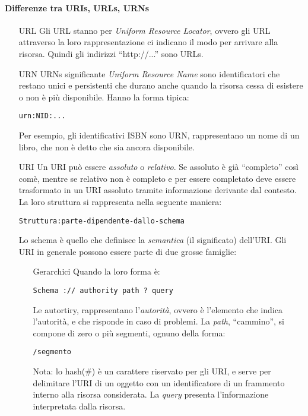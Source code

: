 \paragraph*{Differenze tra URIs, URLs, URNs}
\begin{itemize}
  \item[URL] Gli URL stanno per \textit{Uniform Resource Locator}, ovvero gli URL attraverso la loro rappresentazione ci indicano il modo per arrivare alla risorsa. Quindi gli indirizzi ``http://...'' sono URLs.

\item[URN] URNs significante \textit{Uniform Resource Name} sono identificatori che restano unici e persistenti che durano anche quando la risorsa cessa di esistere o non \`e pi\`u disponibile. Hanno la forma tipica:
\begin{verbatim}
urn:NID:...
\end{verbatim}
Per esempio, gli identificativi ISBN sono URN, rappresentano un nome di un libro, che non \`e detto che sia ancora disponibile.

\item[URI] Un URI pu\`o essere \textit{assoluto} o \textit{relativo}. Se assoluto \`e gi\`a ``completo'' cos\`i com\`e, mentre se relativo non \`e completo e per essere completato deve essere trasformato in un URI assoluto tramite informazione derivante dal contesto. La loro struttura si rappresenta nella seguente maniera:
\begin{verbatim}
Struttura:parte-dipendente-dallo-schema
\end{verbatim}

Lo schema \`e quello che definisce la \textit{semantica} (il significato) dell'URI. Gli URI in generale possono essere parte di due grosse famiglie:
\begin{itemize}

\item[Gerarchici] Quando la loro forma \`e:
  \begin{verbatim}
Schema :// authority path ? query
\end{verbatim}

Le autortiry, rappresentano l'\textit{autorit\`a}, ovvero \`e l'elemento che indica l'autorit\`a, e che risponde in caso di problemi. La \textit{path}, ``cammino'', si compone di zero o pi\`u segmenti, ognuno della forma:
\begin{verbatim}
/segmento
\end{verbatim}
Nota: lo hash(\#) \`e un carattere riservato per gli URI, e serve per delimitare l'URI di un oggetto con un identificatore di un frammento interno alla risorsa considerata.
La \textit{query} presenta l'informazione interpretata dalla risorsa.


\end{itemize}
\end{itemize}
